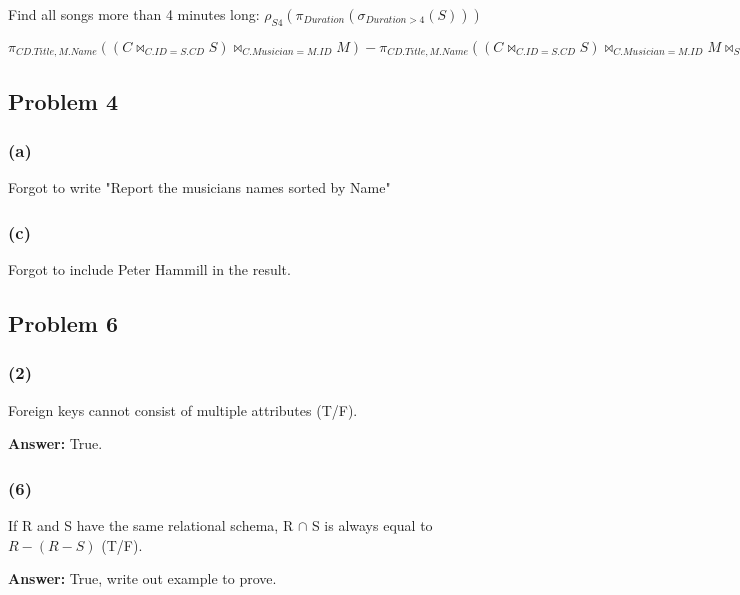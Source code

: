 \documentclass{article}
\begin{document}
Find all songs more than 4 minutes long: $\rho_{S4}(\pi_{Duration}(
    \sigma_{Duration > 4}(S)))$

$\pi_{CD.Title, M.Name}((C \bowtie_{C.ID = S.CD} S) \bowtie_{C.Musician = M.ID}
M) - \pi_{CD.Title, M.Name}((C \bowtie_{C.ID = S.CD} S) \bowtie_{C.Musician =
M.ID} M \bowtie_{S.Duration > 4} S)$

\subsection*{Problem 4}
\subsubsection*{(a)}
Forgot to write "Report the musicians names sorted by Name" \newline

\subsubsection*{(c)}
Forgot to include Peter Hammill in the result. \newline

\subsection*{Problem 6}
\subsubsection*{(2)}
Foreign keys cannot consist of multiple attributes (T/F). \newline

\textbf{Answer:} True.

\subsubsection*{(6)}
If R and S have the same relational schema, R $\cap$ S is always equal to
$R - (R - S)$ (T/F). \newline

\textbf{Answer:} True, write out example to prove.
\end{document}
